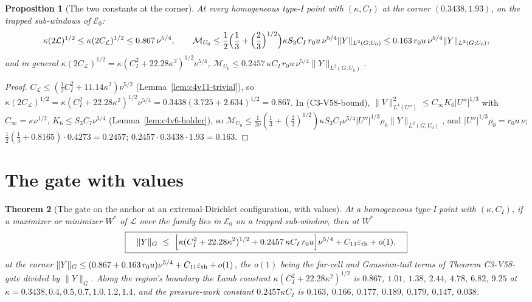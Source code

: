 \documentclass[11pt]{article}
\theoremstyle{plain}
\newtheorem{theorem}{Theorem}[section]
\newtheorem{proposition}[theorem]{Proposition}
\theoremstyle{definition}
\theoremstyle{remark}
\begin{document}
\begin{proposition}[The two constants at the corner]
\label{prop:c4v16-constants}
At every homogeneous type-I point with \((\kappa,C_I)\) at the corner
\((0.3438,1.93)\), on the trapped sub-windows of \(\mathcal E_0\):
\begin{equation}
 \kappa(2\mathcal L)^{1/2}\le\kappa(2C_{\mathcal L})^{1/2}\le0.867\,\nu^{5/4},\qquad
 \mathcal M_{U_0}\le\frac12\Bigl(\frac13+\Bigl(\frac23\Bigr)^{1/2}\Bigr)\kappa S_3C_I\,r_0u\,\nu^{5/4}\|Y\|_{L^2(G;U_0)}\le0.163\,r_0u\,\nu^{5/4}\|Y\|_{L^2(G;U_0)} ,
 \label{eq:c4v16-constants}
\end{equation}
and in general \(\kappa(2C_{\mathcal L})^{1/2}=\kappa(C_I^2+22.28\kappa^2)^{1/2}\nu^{5/4}\), \(\mathcal M_{U_0}\le0.2457\,\kappa C_I\,r_0u\,\nu^{5/4}\|Y\|_{L^2(G;U_0)}\).
\end{proposition}

\begin{proof}
\(C_{\mathcal L}\le(\frac12C_I^2+11.14\kappa^2)\nu^{5/2}\) (Lemma~\ref{lem:c4v11-trivial}), so
\(\kappa(2C_{\mathcal L})^{1/2}=\kappa(C_I^2+22.28\kappa^2)^{1/2}\nu^{5/4}=0.3438(3.725+2.634)^{1/2}=0.867\).  In
(C3-V58-bound), \(\|V\|_{L^4(U'')}^2\le C_\infty K_6|U''|^{1/3}\) with \(C_\infty=\kappa\nu^{1/2}\), \(K_6\le S_3C_I\nu^{3/4}\)
(Lemma~\ref{lem:c4v6-holder}), so
\(\mathcal M_{U_0}\le\frac1{2\nu}(\frac13+(\frac23)^{1/2})\kappa S_3C_I\nu^{5/4}|U''|^{1/3}\rho_0\|Y\|_{L^2(G;U_0)}\), and \(|U''|^{1/3}\rho_0=r_0u\,\nu\);
\(\frac12(\frac13+0.8165)\cdot0.4273=0.2457\); \(0.2457\cdot0.3438\cdot1.93=0.163\).
\end{proof}

\section{The gate with values}
\label{sec:c4v16-gate}

\begin{theorem}[The gate on the anchor at an extremal-Dirichlet configuration, with values]
\label{thm:c4v16-gate}
At a homogeneous type-I point with \((\kappa,C_I)\), if a maximizer or
minimizer \(W^*\) of \(\mathcal L\) over the family lies in \(\mathcal E_0\) on a trapped
sub-window, then at \(W^*\)
\begin{equation}
 \boxed{\quad
 \|Y\|_G\ \le\ \Bigl[\kappa(C_I^2+22.28\kappa^2)^{1/2}+0.2457\,\kappa C_I\,r_0u\Bigr]\nu^{5/4}+C_{11}\varepsilon_{\rm th}+o(1),
 \quad}
 \label{eq:c4v16-gate}
\end{equation}
at the corner \(\|Y\|_G\le(0.867+0.163\,r_0u)\nu^{5/4}+C_{11}\varepsilon_{\rm th}+o(1)\), the \(o(1)\) being the
far-cell and Gaussian-tail terms of Theorem C3-V58-gate divided by
\(\|Y\|_G\).  Along the region's boundary the Lamb constant
\(\kappa(C_I^2+22.28\kappa^2)^{1/2}\) is \(0.867\), \(1.01\), \(1.38\), \(2.44\), \(4.78\), \(6.82\), \(9.25\) at
\(\kappa=0.3438,0.4,0.5,0.7,1.0,1.2,1.4\), and the pressure-work constant
\(0.2457\kappa C_I\) is \(0.163\), \(0.166\), \(0.177\), \(0.189\), \(0.179\), \(0.147\), \(0.038\).
\end{theorem}
\end{document}
